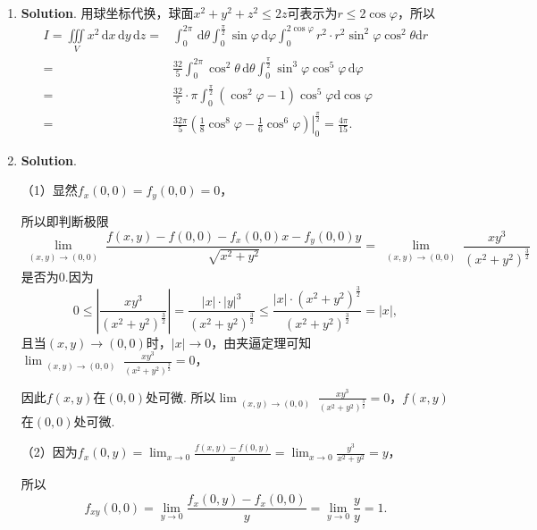 \documentclass[../main.tex]{subfiles}
\begin{document}
\begin{enumerate}
    \item \textbf{Solution}. 用球坐标代换，球面$x^{2}+y^{2}+z^{2}\leq 2z$可表示为$r
              \leq 2\cos \varphi$，所以
          \[
              \begin{aligned}
                  I = \iiint\limits_{V}x^{2}\,\mathrm{d}x\,\mathrm{d}y\,\mathrm{d}z = {} & \int_{0}^{2\pi}\,\mathrm{d}\theta\int_{0}^{\frac{\pi}{2}}\sin\varphi\,\mathrm{d}\varphi\int_{0}^{2\cos \varphi}r^{2}\cdot r^{2}\sin^{2}\varphi\cos^{2}\theta \mathrm{d}r \\
                  = {}                                                                   & \frac{32}{5}\int_{0}^{2\pi}\cos^{2}\theta\,\mathrm{d}\theta\int_{0}^{\frac{\pi}{2}}\sin^{3}\varphi\cos^{5}\varphi\,\mathrm{d}\varphi                                     \\
                  = {}                                                                   & \frac{32}{5}\cdot \pi\int_{0}^{\frac{\pi}{2}}\left(\cos^{2} \varphi - 1\right)\cos^{5} \varphi \mathrm{d}\cos\varphi                                                     \\
                  = {}                                                                   & \frac{32\pi}{5}\left.\left(\frac{1}{8}\cos^{8} \varphi - \frac{1}{6}\cos^{6} \varphi\right)\right|_{0}^{\frac{\pi}{2}}= \frac{4\pi}{15}.
              \end{aligned}
          \]

    \item \textbf{Solution}.

          （1）显然$f_{x}(0,0) = f_{y}(0,0) = 0$，

          所以即判断极限
          \[
              \lim_{\substack{(x,y)\to (0,0)}}\frac{f(x,y)-f(0,0)-f_{x}(0,0)x-f_{y}(0,0)y}{\sqrt{x^{2}+y^{2}}}
              = \lim_{\substack{(x,y)\to (0,0)}}\frac{xy^{3}}{(x^{2}+y^{2})^{\frac{3}{2}}}
          \]
          是否为$0$.因为
          \[
              0 \leq \left|\frac{xy^{3}}{(x^{2}+y^{2})^{\frac{3}{2}}}\right| = \frac{|x|\cdot|y|^{3}}{(x^{2}+y^{2})^{\frac{3}{2}}}
              \leq \frac{|x|\cdot (x^{2}+y^{2})^{\frac{3}{2}}}{(x^{2}+y^{2})^{\frac{3}{2}}}
              = |x|,
          \]
          且当$(x,y)\to (0,0)$时，$|x|\to 0$，由夹逼定理可知$\lim_{\substack{(x,y)\to (0,0)}}\frac{xy^{3}}{(x^{2}+y^{2})^{\frac{3}{2}}}= 0$，

          因此$f(x,y)$在$(0,0)$处可微. 所以$\lim_{\substack{(x,y)\to (0,0)}}\frac{xy^{3}}{(x^{2}+y^{2})^{\frac{3}{2}}}
              = 0$，$f(x,y)$在$(0,0)$处可微.

          （2）因为$f_{x}(0,y)=\lim_{x\to0}\frac{f(x,y)-f(0,y)}{x}= \lim_{x\to0}\frac{y^{3}}{x^{2}+y^{2}}
              = y$，

          所以
          \[
              f_{xy}(0,0) = \lim_{y\to0}\frac{f_{x}(0,y)-f_{x}(0,0)}{y}= \lim_{y\to0}
              \frac{y}{y}= 1.
          \]

\end{enumerate}
\end{document}
